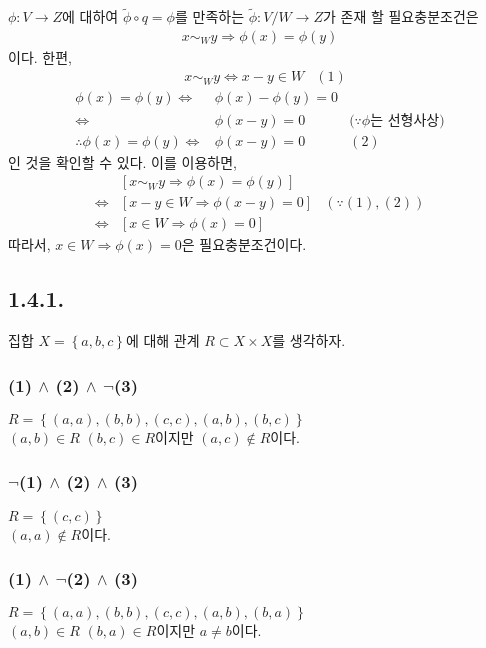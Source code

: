 \documentclass{article}
\begin{document}
$\phi : V \rightarrow Z$에 대하여 $\widetilde{\phi} \circ q = \phi$를 만족하는 $\widetilde{\phi} : V/W \rightarrow Z$가 존재 할 필요충분조건은
\begin{align*}
x \sim_{W} y \Rightarrow \phi(x) = \phi(y)
\end{align*}
이다. 한편,
\begin{align*}
&x \sim_{W} y \iff x - y \in W & (1)
\end{align*}
\begin{align*}
\phi(x) = \phi(y) \iff& \phi(x) - \phi(y) = 0 &
\\ \iff& \phi(x - y) = 0 &\text{($\because \phi$는 선형사상)}
\\ \therefore \phi(x) = \phi(y) \iff& \phi(x - y) = 0& (2)
\end{align*}
인 것을 확인할 수 있다. 이를 이용하면, 
\begin{align*}
&\left[ x \sim_{W} y \Rightarrow \phi(x) = \phi(y) \right] &
\\ \iff &\left[ x - y \in W \Rightarrow \phi(x - y) = 0 \right] &(\because (1), (2))
\\ \iff &\left[ x \in W \Rightarrow \phi(x) = 0 \right] &
\end{align*}
따라서, $ x \in W \Rightarrow \phi(x) = 0$은 필요충분조건이다.

\subsection{1.4.1.}
집합 $X = \left\{a, b, c\right\}$에 대해 관계 $R \subset X \times X$를 생각하자.
\subsubsection{(1) $\wedge$ (2) $\wedge$ $\lnot$(3)}
$R = \left\{(a, a), (b, b), (c, c), (a, b), (b, c) \right\}$
\\$(a, b) \in R$ $(b, c) \in R$이지만 $(a, c) \notin R$이다.

\subsubsection{$\lnot$(1) $\wedge$ (2) $\wedge$ (3)}
$R = \left\{(c, c) \right\}$
\\$(a, a) \notin R$이다.

\subsubsection{(1) $\wedge$ $\lnot$(2) $\wedge$ (3)}
$R = \left\{ (a, a), (b, b), (c, c), (a, b), (b, a) \right\}$
\\$(a, b) \in R$ $(b, a) \in R$이지만 $a \neq b$이다.
\end{document}
